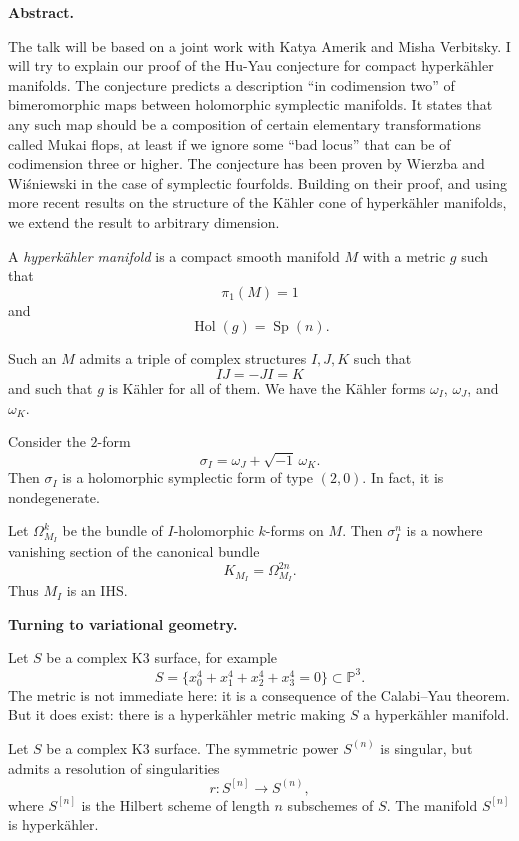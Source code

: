 \medskip\noindent
{\bf Abstract.}

The talk will be based on a joint work
with Katya Amerik and Misha Verbitsky.
I will try to explain our proof of the
Hu-Yau conjecture for compact
hyperkähler manifolds. The conjecture
predicts a description ``in codimension
two'' of bimeromorphic maps between
holomorphic symplectic manifolds. It
states that any such map should be a
composition of certain elementary
transformations called Mukai flops, at
least if we ignore some ``bad locus''
that can be of codimension three or
higher. The conjecture has been proven
by Wierzba and Wiśniewski in the case
of symplectic fourfolds. Building on
their proof, and using more recent
results on the structure of the Kähler
cone of hyperkähler manifolds, we
extend the result to arbitrary
dimension.

\begin{definition}
\label{definition-hyperk-ahler}
A {\it hyperk\"ahler manifold} is a
compact
smooth manifold $M$ with a metric $g$
such that
\[
\pi_1(M)=1
\]
and
\[
\operatorname{Hol}(g)
=
\operatorname{Sp}(n).
\]
\end{definition}

\begin{remark}
\label{remark-such-m}
Such an $M$ admits a triple of complex
structures $I,J,K$ such that
\[
IJ=-JI=K
\]
and such that $g$ is K\"ahler for all
of them.
We have the K\"ahler forms
$\omega_I$, $\omega_J$, and
$\omega_K$.
\end{remark}

Consider the $2$-form
\[
\sigma_I=\omega_J+\sqrt{-1}\,\omega_K.
\]
Then $\sigma_I$ is a holomorphic
symplectic form of type $(2,0)$.
In fact, it is nondegenerate.

Let $\Omega^k_{M_I}$ be the bundle of
$I$-holomorphic $k$-forms on $M$.
Then $\sigma_I^n$ is a nowhere
vanishing section of the canonical
bundle
\[
K_{M_I}=\Omega^{2n}_{M_I}.
\]
Thus $M_I$ is an IHS.

\medskip\noindent
{\bf Turning to variational geometry.}

\begin{example}
\label{example-let-s2}
Let $S$ be a complex K3 surface, for
example
\[
S=
\{x_0^4+x_1^4+x_2^4+x_3^4=0\}
\subset \mathbb{P}^3.
\]
The metric is not immediate here:
it is a consequence of the
Calabi--Yau theorem.
But it does exist:
there is a hyperk\"ahler metric making
$S$ a hyperk\"ahler manifold.
\end{example}

\begin{example}
\label{example-let-s2-duplicate-2}
Let $S$ be a complex K3 surface.
The symmetric power $S^{(n)}$ is
singular, but admits a resolution of
singularities
\[
r:S^{[n]}\to S^{(n)},
\]
where $S^{[n]}$ is the Hilbert scheme
of length $n$ subschemes of $S$.
The manifold $S^{[n]}$ is
hyperk\"ahler.
\end{example}

